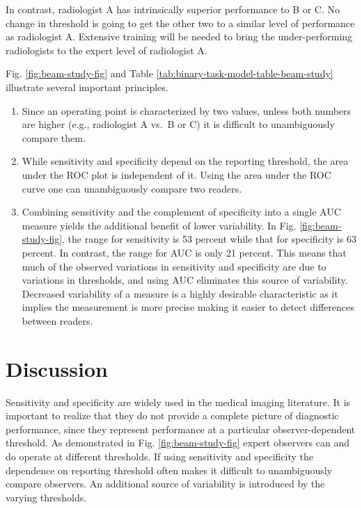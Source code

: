 \documentclass[
]{book}
\begin{document}
In contrast, radiologist A has intrinsically superior performance to B or C. No change in threshold is going to get the other two to a similar level of performance as radiologist A. Extensive training will be needed to bring the under-performing radiologists to the expert level of radiologist A.

Fig. \ref{fig:beam-study-fig} and Table \ref{tab:binary-task-model-table-beam-study} illustrate several important principles.

\begin{enumerate}
\def\labelenumi{\arabic{enumi}.}
\item
  Since an operating point is characterized by two values, unless both numbers are higher (e.g., radiologist A vs.~B or C) it is difficult to unambiguously compare them.
\item
  While sensitivity and specificity depend on the reporting threshold, the area under the ROC plot is independent of it. Using the area under the ROC curve one can unambiguously compare two readers.
\item
  Combining sensitivity and the complement of specificity into a single AUC measure yields the additional benefit of lower variability. In Fig. \ref{fig:beam-study-fig}, the range for sensitivity is 53 percent while that for specificity is 63 percent. In contrast, the range for AUC is only 21 percent. This means that much of the observed variations in sensitivity and specificity are due to variations in thresholds, and using AUC eliminates this source of variability. Decreased variability of a measure is a highly desirable characteristic as it implies the measurement is more precise making it easier to detect differences between readers.
\end{enumerate}

\hypertarget{binary-task-model-discussion}{%
\section{Discussion}\label{binary-task-model-discussion}}

Sensitivity and specificity are widely used in the medical imaging literature. It is important to realize that they do not provide a complete picture of diagnostic performance, since they represent performance at a particular observer-dependent threshold. As demonstrated in Fig. \ref{fig:beam-study-fig} expert observers can and do operate at different thresholds. If using sensitivity and specificity the dependence on reporting threshold often makes it difficult to unambiguously compare observers. An additional source of variability is introduced by the varying thresholds.
\end{document}
